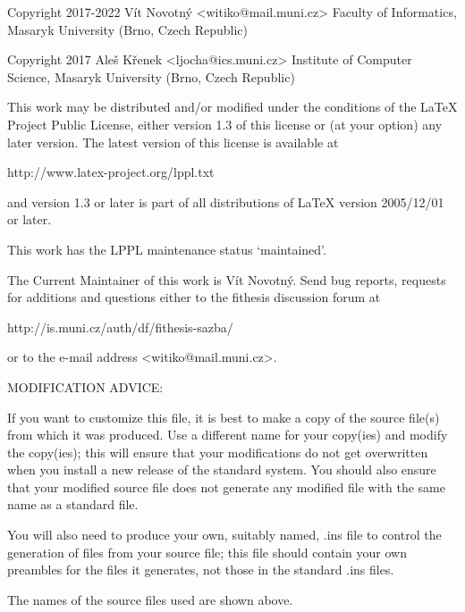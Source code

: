 
\preamble

Copyright 2017-2022  Vít Novotný <witiko@mail.muni.cz>
Faculty of Informatics, Masaryk University (Brno, Czech Republic)

Copyright 2017  Aleš Křenek <ljocha@ics.muni.cz>
Institute of Computer Science, Masaryk University (Brno, Czech Republic)

This work may be distributed and/or modified under the
conditions of the LaTeX Project Public License, either version
1.3 of this license or (at your option) any later version.
The latest version of this license is available at

  http://www.latex-project.org/lppl.txt

and version 1.3 or later is part of all distributions of LaTeX
version 2005/12/01 or later.

This work has the LPPL maintenance status `maintained'.

The Current Maintainer of this work is Vít Novotný.
Send bug reports, requests for additions and questions
either to the fithesis discussion forum at

  http://is.muni.cz/auth/df/fithesis-sazba/

or to the e-mail address <witiko@mail.muni.cz>.


MODIFICATION ADVICE:

If you want to customize this file, it is best to make a copy of
the source file(s) from which it was produced.  Use a different
name for your copy(ies) and modify the copy(ies); this will ensure
that your modifications do not get overwritten when you install a
new release of the standard system.  You should also ensure that
your modified source file does not generate any modified file with
the same name as a standard file.

You will also need to produce your own, suitably named, .ins file to
control the generation of files from your source file; this file
should contain your own preambles for the files it generates, not
those in the standard .ins files.

The names of the source files used are shown above.

\endpreamble
\askforoverwritefalse
